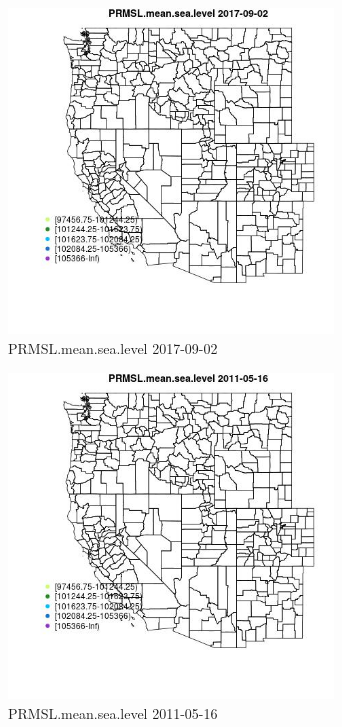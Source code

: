 \begin{figure} 
\centering  
\includegraphics[width=0.77\textwidth]{Code_Outputs/Report_ML_input_PM25_Step4_part_e_de_duplicated_aveswNAs_MapObsPRMSLmeansealevel2017-09-02.jpg} 
\caption{\label{fig:Report_ML_input_PM25_Step4_part_e_de_duplicated_aveswNAsMapObsPRMSLmeansealevel2017-09-02}PRMSL.mean.sea.level 2017-09-02} 
\end{figure} 
 

\begin{figure} 
\centering  
\includegraphics[width=0.77\textwidth]{Code_Outputs/Report_ML_input_PM25_Step4_part_e_de_duplicated_aveswNAs_MapObsPRMSLmeansealevel2011-05-16.jpg} 
\caption{\label{fig:Report_ML_input_PM25_Step4_part_e_de_duplicated_aveswNAsMapObsPRMSLmeansealevel2011-05-16}PRMSL.mean.sea.level 2011-05-16} 
\end{figure} 
 

